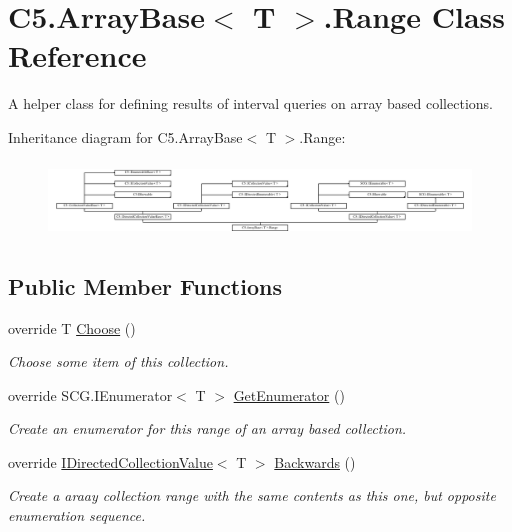 \hypertarget{class_c5_1_1_array_base_1_1_range}{}\section{C5.\+Array\+Base$<$ T $>$.Range Class Reference}
\label{class_c5_1_1_array_base_1_1_range}


A helper class for defining results of interval queries on array based collections.  


Inheritance diagram for C5.\+Array\+Base$<$ T $>$.Range\+:\begin{figure}[H]
\begin{center}
\leavevmode
\includegraphics[height=2.016807cm]{class_c5_1_1_array_base_1_1_range}
\end{center}
\end{figure}
\subsection*{Public Member Functions}
\begin{DoxyCompactItemize}
\item 
override T \hyperlink{class_c5_1_1_array_base_1_1_range_a914b2f3399f5286d462af7f1837373db}{Choose} ()
\begin{DoxyCompactList}\small\item\em Choose some item of this collection. \end{DoxyCompactList}\item 
override S\+C\+G.\+I\+Enumerator$<$ T $>$ \hyperlink{class_c5_1_1_array_base_1_1_range_af6396c46d77d98185e8587c024dd9316}{Get\+Enumerator} ()
\begin{DoxyCompactList}\small\item\em Create an enumerator for this range of an array based collection. \end{DoxyCompactList}\item 
override \hyperlink{interface_c5_1_1_i_directed_collection_value}{I\+Directed\+Collection\+Value}$<$ T $>$ \hyperlink{class_c5_1_1_array_base_1_1_range_a296cf1453eb618368fdc14f7abc4f4c2}{Backwards} ()
\begin{DoxyCompactList}\small\item\em Create a araay collection range with the same contents as this one, but opposite enumeration sequence. \end{DoxyCompactList}\end{DoxyCompactItemize}
